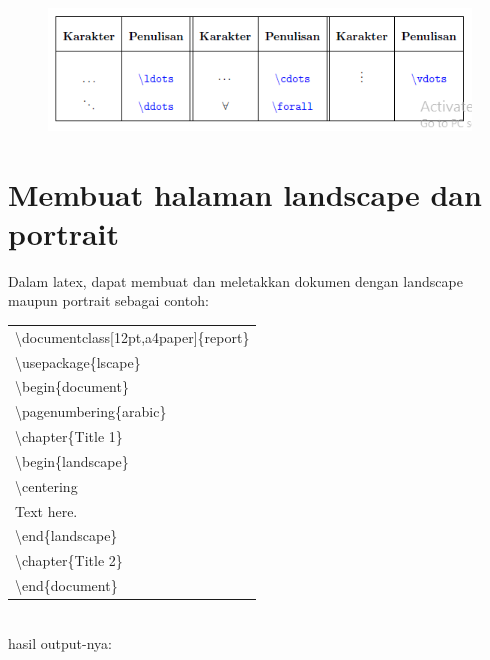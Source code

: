 \begin{figure}[h!]
\centering
\includegraphics[width=10 cm]{img/17.png}
\end{figure}
\newpage
\section{Membuat halaman landscape dan portrait}
Dalam latex, dapat membuat dan meletakkan dokumen dengan landscape maupun  portrait sebagai contoh:\\[0.5 cm]
\begin{tabular}{|p{13.5 cm}|}
\hline
\textbackslash documentclass[12pt,a4paper]\{report\}\\
\textbackslash usepackage\{lscape\}\\
\textbackslash begin\{document\}\\
\textbackslash  pagenumbering\{arabic\}\\
\textbackslash chapter\{Title 1\}\\
\textbackslash  begin\{landscape\}\\
\textbackslash centering\\
Text here.\\
\textbackslash end\{landscape\}\\
\textbackslash  chapter\{Title 2\}\\
\textbackslash  end\{document\}\\
\hline
\end{tabular}\\[0.5 cm]
hasil output-nya:\\
